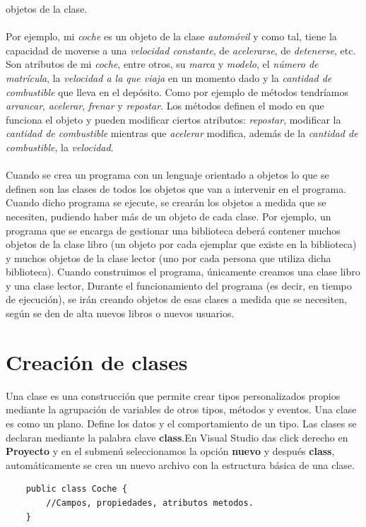 \documentclass[12pt,a4paper]{report}
\begin{document}
objetos de la clase.\\\\Por ejemplo, mi \textit{coche} es un objeto de la clase \textit{automóvil} y como tal, tiene la capacidad de moverse a una \textit{velocidad constante}, de \textit{acelerarse}, de \textit{detenerse}, etc. Son atributos de mi \textit{coche}, entre otros, su \textit{marca} y \textit{modelo}, el \textit{número de matrícula}, la \textit{velocidad a la que viaja} en un momento dado y la \textit{cantidad de combustible} que lleva en el depósito. Como por ejemplo de métodos tendríamos \textit{arrancar}, \textit{acelerar}, \textit{frenar} y \textit{repostar}. Los métodos definen el modo en que funciona el objeto y pueden modificar ciertos atributos: \textit{repostar}, modificar la \textit{cantidad de combustible} mientras que \textit{acelerar} modifica, además de la \textit{cantidad de combustible}, la \textit{velocidad}.\\\\Cuando se crea un programa con un lenguaje orientado a objetos lo que se definen son las clases de todos los objetos que van a intervenir en el programa. Cuando dicho programa se ejecute, se crearán los objetos a medida que se necesiten, pudiendo haber más de un objeto de cada clase. Por ejemplo, un programa que se encarga de gestionar una biblioteca deberá contener muchos objetos de la clase libro (un objeto por cada ejemplar que existe en la biblioteca) y muchos objetos de la clase lector (uno por cada persona que utiliza dicha biblioteca). Cuando construimos el programa, únicamente creamos una clase libro y una clase lector, Durante el funcionamiento del programa (es decir, en tiempo de ejecución), se irán creando objetos de esas clases a medida que se necesiten, según se den de alta nuevos libros o nuevos usuarios.
\section{Creación de clases}
Una clase es una construcción que permite crear tipos personalizados propios mediante la agrupación de variables de otros tipos, métodos y eventos. Una clase es como un plano. Define los datos y el comportamiento de un tipo. Las clases se declaran mediante la palabra clave \textbf{class}.En Visual Studio das click derecho en \textbf{Proyecto} y en el submenú seleccionamos la opción \textbf{nuevo} y después \textbf{class}, automáticamente se crea un nuevo archivo con la estructura básica de una clase.    
\begin{lstlisting}
	public class Coche {
		//Campos, propiedades, atributos metodos.
	}
\end{lstlisting}
\end{document}
